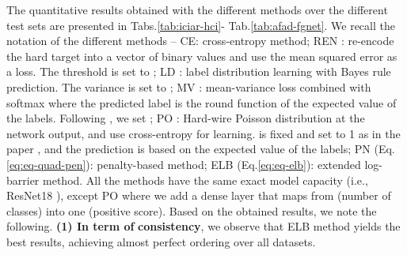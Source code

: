\documentclass[8pt]{article}
\theoremstyle{definition}
\begin{document}
The quantitative results obtained with the different methods over the different test sets are presented in Tabs.\ref{tab:iciar-hci}- Tab.\ref{tab:afad-fgnet}. We recall the notation of the different methods --
CE:  cross-entropy method;
 REN \citep{cheng2008neural}: re-encode the hard target into a vector of binary values and use the mean squared error as a loss. The threshold is set to ;
 LD \citep{gao2017deep,geng2016label,geng2013facial,huo2016deep}: label distribution learning with Bayes rule prediction. The variance is set to ;
 MV \citep{pan2018mean}: mean-variance loss combined with softmax where the predicted label is the round function of the expected value of the labels. Following \citep{pan2018mean}, we set ;
 PO \citep{beckham2017unimodal}: Hard-wire Poisson distribution at the network output, and use cross-entropy for learning.  is fixed and set to 1 as in the paper \citep{beckham2017unimodal}, and the prediction is based on the expected value of the labels;
 PN (Eq.\ref{eq:eq-quad-pen}): penalty-based method;
 ELB (Eq.\ref{eq:eq-elb}): extended log-barrier method.
All the methods have the same exact model capacity (i.e., ResNet18 \citep{heZRS16}), except PO \citep{beckham2017unimodal} where we add a dense layer that maps from  (number of classes) into one (positive score). Based on the obtained results, we note the following.
\textbf{(1) In term of}  \textbf{consistency}, we observe that ELB method yields the best results, achieving almost perfect ordering  over all datasets.
\end{document}
